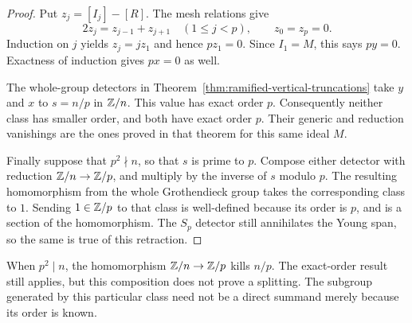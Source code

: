 \begin{proof}
Put $z_j=[I_j]-[R]$.  The mesh relations give
\[
 2z_j=z_{j-1}+z_{j+1}\quad(1\leq j<p),\qquad z_0=z_p=0.
\]
Induction on $j$ yields $z_j=jz_1$ and hence $pz_1=0$.
Since $I_1=M$, this says $py=0$.  Exactness of induction gives
$px=0$ as well.

The whole-group detectors in
Theorem~\ref{thm:ramified-vertical-truncations} take $y$ and
$x$ to $s=n/p$ in $\mathbb Z/n$.  This value has exact order $p$.
Consequently neither class has smaller order, and both have exact
order $p$.  Their generic and reduction vanishings are the ones
proved in that theorem for this same ideal $M$.

Finally suppose that $p^2\nmid n$, so that $s$ is prime to $p$.
Compose either detector with reduction $\mathbb Z/n\to\mathbb Z/p$, and
multiply by the inverse of $s$ modulo $p$.  The resulting
homomorphism from the whole Grothendieck group takes the
corresponding class to $1$.  Sending $1\in\mathbb Z/p$ to that class
is well-defined because its order is $p$, and is a section of the
homomorphism.  The $S_p$ detector still annihilates the Young span,
so the same is true of this retraction.
\end{proof}

\begin{remark}
When $p^2\mid n$, the homomorphism $\mathbb Z/n\to\mathbb Z/p$ kills
$n/p$.  The exact-order result still applies, but this composition
does not prove a splitting.  The subgroup generated by this
particular class need not be a direct summand merely because its
order is known.
\end{remark}
